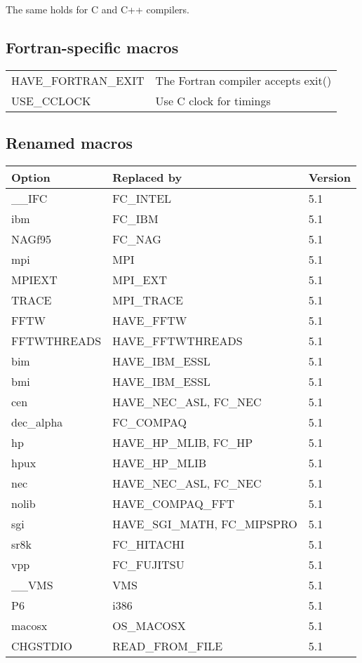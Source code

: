The same holds for C and C++ compilers.



\subsection{Fortran-specific macros}

\begin{center}
 \begin{tabular}{l l}
  HAVE\_FORTRAN\_EXIT & The Fortran compiler accepts exit() \\
  USE\_CCLOCK & Use C clock for timings \\
 \end{tabular}
\end{center}



\subsection{Renamed macros}

\begin{center}
 \begin{tabular}{|l|l|l|}
  \hline
  \textbf{Option} & \textbf{Replaced by} & \textbf{Version} \\
  \hline
  \_\_IFC & FC\_INTEL & 5.1 \\
  ibm & FC\_IBM & 5.1 \\
  NAGf95 & FC\_NAG & 5.1 \\
  \hline
  mpi & MPI & 5.1 \\
  MPIEXT & MPI\_EXT & 5.1 \\
  TRACE & MPI\_TRACE & 5.1 \\
  \hline
  FFTW & HAVE\_FFTW & 5.1 \\
  FFTWTHREADS & HAVE\_FFTWTHREADS & 5.1 \\
  \hline
  bim & HAVE\_IBM\_ESSL & 5.1 \\
  bmi & HAVE\_IBM\_ESSL & 5.1 \\
  cen & HAVE\_NEC\_ASL, FC\_NEC & 5.1 \\
  dec\_alpha & FC\_COMPAQ & 5.1 \\
  hp & HAVE\_HP\_MLIB, FC\_HP & 5.1 \\
  hpux & HAVE\_HP\_MLIB & 5.1 \\
  nec & HAVE\_NEC\_ASL, FC\_NEC & 5.1 \\
  nolib & HAVE\_COMPAQ\_FFT & 5.1 \\
  sgi & HAVE\_SGI\_MATH, FC\_MIPSPRO & 5.1 \\
  sr8k & FC\_HITACHI & 5.1 \\
  vpp & FC\_FUJITSU & 5.1 \\
  \hline
  \_\_VMS & VMS & 5.1 \\
  P6 & i386 & 5.1 \\
  macosx & OS\_MACOSX & 5.1 \\
  \hline
  CHGSTDIO & READ\_FROM\_FILE & 5.1 \\
  \hline
 \end{tabular}
\end{center}



